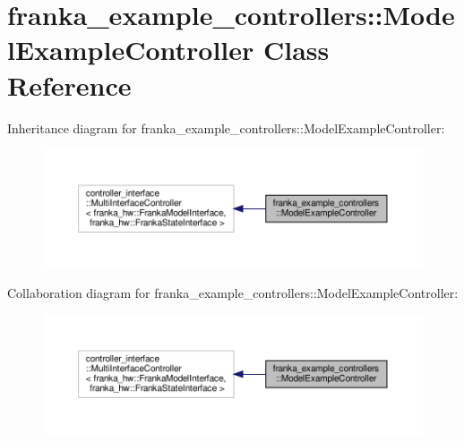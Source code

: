 \hypertarget{classfranka__example__controllers_1_1_model_example_controller}{}\section{franka\+\_\+example\+\_\+controllers\+:\+:Model\+Example\+Controller Class Reference}
\label{classfranka__example__controllers_1_1_model_example_controller}


Inheritance diagram for franka\+\_\+example\+\_\+controllers\+:\+:Model\+Example\+Controller\+:
\nopagebreak
\begin{figure}[H]
\begin{center}
\leavevmode
\includegraphics[width=350pt]{classfranka__example__controllers_1_1_model_example_controller__inherit__graph}
\end{center}
\end{figure}


Collaboration diagram for franka\+\_\+example\+\_\+controllers\+:\+:Model\+Example\+Controller\+:
\nopagebreak
\begin{figure}[H]
\begin{center}
\leavevmode
\includegraphics[width=350pt]{classfranka__example__controllers_1_1_model_example_controller__coll__graph}
\end{center}
\end{figure}
